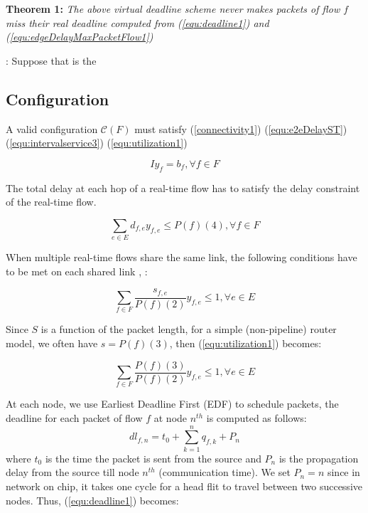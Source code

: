 \documentclass[conference, twocolumn]{IEEEtran}
\theoremstyle{definition}
\begin{document}
{\textbf{Theorem 1:}} {\em  The above virtual deadline scheme never makes
packets of flow $f$ miss their real deadline computed from
(\ref{equ:deadline1}) and (\ref{equ:edgeDelayMaxPacketFlow1})}

{\Prove:} Suppose that  is the 

\subsection{Configuration}
A valid configuration $\mathcal{C}(F)$ must satisfy (\ref{connectivity1}) 
(\ref{equ:e2eDelayST}) (\ref{equ:intervalservice3}) (\ref{equ:utilization1})

\begin{equation}\label{connectivity1} Iy_f=b_f,\forall f \in F
\end{equation}

The total delay at each hop of a real-time flow has to satisfy the delay constraint
of the real-time flow.

\begin{equation}\label{equ:e2eDelayST}
\sum_{e \in E}d_{f,e}y_{f,e} \leq P(f)(4), \forall f \in F
\end{equation}

When multiple real-time flows share the same link, the following conditions
 have to be met on each shared link \cite{Ferrari90ascheme},
 \cite{VermaJitter91}:

\begin{equation}\label{equ:utilization1}
\sum_{f \in F}\frac{s_{f,e}}{P(f)(2)}y_{f,e} \leq 1, \forall e \in E
\end{equation}

Since $S$ is a function of the packet length, for a simple (non-pipeline) router
model, we often have $s=P(f)(3)$, then (\ref{equ:utilization1}) becomes:

\begin{equation}\label{equ:utilization2}
\sum_{f \in F}\frac{P(f)(3)}{P(f)(2)}y_{f,e} \leq 1, \forall e \in E
\end{equation}

At each node, we use Earliest Deadline First (EDF) \cite{VermaJitter91} 
to schedule packets, the deadline for each packet of flow $f$ at node $n^{th}$
is computed as follows: 
\begin{equation}\label{equ:deadline1}
dl_{f,n}=t_0 + \sum_{k=1}^{n}q_{f,k}+P_n
\end{equation}
where $t_0$ is the time the packet is sent from the source and $P_n$ is the propagation
delay from the source till node $n^{th}$ (communication time). We set
$P_n=n$ since in network on chip, it takes one cycle for a head flit to travel
between two successive nodes. Thus, (\ref{equ:deadline1}) becomes:
\end{document}
